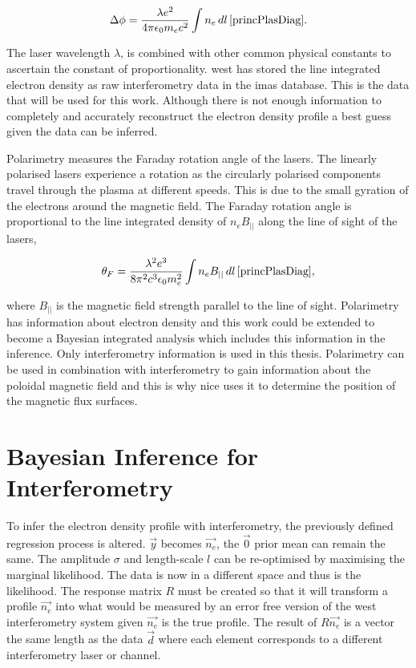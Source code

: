 \begin{equation} 
  \label{eq:int_phase}
  \Delta\phi = \frac{\lambda e^{2}}{4 \pi \epsilon_0 m_e c^2 } \int n_e \, dl \, \cite{princPlasDiag}.
\end{equation}

\noindent The laser wavelength $\lambda$, is combined with other common physical constants to ascertain the constant of proportionality. \gls{west} has stored the line integrated electron density as raw interferometry data in the \gls{imas} database. This is the data that will be used for this work. Although there is not enough information to completely and accurately reconstruct the electron density profile a best guess given the data can be inferred.

Polarimetry measures the Faraday rotation angle of the lasers. The linearly polarised lasers experience a rotation as the circularly polarised components travel through the plasma at different speeds. This is due to the small gyration of the electrons around the magnetic field. The Faraday rotation angle is proportional to the line integrated density of $n_e B_{||}$ along the line of sight of the lasers, 

\begin{equation}
  \label{eq:pol_farad}
  \theta_F = \frac{\lambda^2 e^3}{8 \pi^2 c^3 \epsilon_0 m_e^2} \int n_e B_{||} \, dl \, \cite{princPlasDiag},
\end{equation}

\noindent where $B_{||}$ is the magnetic field strength parallel to the line of sight. Polarimetry has information about electron density and this work could be extended to become a Bayesian integrated analysis which includes this information in the inference. Only interferometry information is used in this thesis. Polarimetry can be used in combination with interferometry to gain information about the poloidal magnetic field and this is why \gls{nice} uses it to determine the position of the magnetic flux surfaces.

\section{Bayesian Inference for Interferometry}\label{sec:InfForInterf}

To infer the electron density profile with interferometry, the previously defined regression process is altered. $\vec{y}$ becomes $\vec{n_e}$, the $\vec{0}$ prior mean can remain the same. The amplitude $\sigma$ and length-scale $l$ can be re-optimised by maximising the marginal likelihood. The data is now in a different space and thus is the likelihood. The response matrix $R$ must be created so that it will transform a profile $\vec{n_e}$ into what would be measured by an error free version of the \gls{west} interferometry system given $\vec{n_e}$ is the true profile. The result of $R \vec{n_e}$ is a vector the same length as the data $\vec{d}$ where each element corresponds to a different interferometry laser or channel. 

